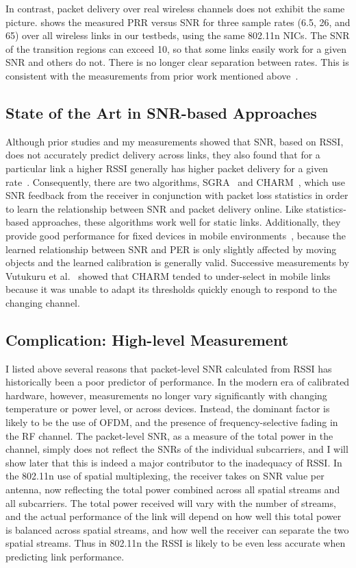In contrast, packet delivery over real wireless channels does not exhibit the same picture.  shows the measured PRR versus SNR for three sample rates (6.5\Mbps, 26\Mbps, and 65\Mbps) over all wireless links in our testbeds, using the same 802.11n NICs. The SNR of the transition regions can exceed 10\dB, so that some links easily work for a given SNR and others do not. There is no longer clear separation between rates. This is consistent with the measurements from prior work mentioned above~\cite{Aguayo_Roofnet, Judd_CHARM, Reis_interference, Zhang_SNRguided, Zhao_sensys03}.

\subsection{State of the Art in SNR-based Approaches}
Although prior studies and my measurements showed that SNR, based on RSSI, does not accurately predict delivery across links, they also found that for a particular link a higher RSSI generally has higher packet delivery for a given rate~\cite{Aguayo_Roofnet,Judd_CHARM,Zhang_SNRguided}. Consequently, there are two algorithms, SGRA~\cite{Zhang_SNRguided} and CHARM~\cite{Judd_CHARM}, which use SNR feedback from the receiver in conjunction with packet loss statistics in order to learn the relationship between SNR and packet delivery online. Like statistics-based approaches, these algorithms work well for static links. Additionally, they provide good performance for fixed devices in mobile environments~\cite{Judd_CHARM}, because the learned relationship between SNR and PER is only slightly affected by moving objects and the learned calibration is generally valid. Successive measurements by Vutukuru et al.~\cite{Vutukuru_SoftRate} showed that CHARM tended to under-select in mobile links because it was unable to adapt its thresholds quickly enough to respond to the changing channel.

\subsection{Complication: High-level Measurement}
I listed above several reasons that packet-level SNR calculated from RSSI has historically been a poor predictor of performance. In the modern era of calibrated hardware, however, measurements no longer vary significantly with changing temperature or power level, or across devices. Instead, the dominant factor is likely to be the use of OFDM, and the presence of frequency-selective fading in the RF channel. The packet-level SNR, as a measure of the total power in the channel, simply does not reflect the SNRs of the individual subcarriers, and I will show later that this is indeed a major contributor to the inadequacy of RSSI. In the 802.11n use of spatial multiplexing, the receiver takes on SNR value per antenna, now reflecting the total power combined across all spatial streams and all subcarriers. The total power received will vary with the number of streams, and the actual performance of the link will depend on how well this total power is balanced across spatial streams, and how well the receiver can separate the two spatial streams. Thus in 802.11n the RSSI is likely to be even less accurate when predicting link performance.

